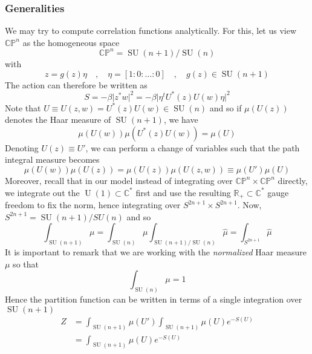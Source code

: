 \documentclass[a4paper,11pt]{article}
\theoremstyle{definition}
\newcommand{\RR}{\mathbb{R}}
\newcommand{\CC}{\mathbb{C}}
\newcommand{\CP}{\mathbb{CP}}
\DeclareMathOperator{\SU}{SU}
\DeclareMathOperator{\U}{U}
\begin{document}
\subsubsection{Generalities}
We may try to compute correlation functions analytically.
For this, let us view $\CP^n$ as the homogeneous space 
\begin{equation}
  \CP^n = \SU(n+1) / \SU(n)
\end{equation}
with 
\begin{equation}
  z = g(z) \eta \quad , \quad \eta = [1:0:\dots:0] \quad , \quad g(z) \in \SU(n+1)
\end{equation}
The action can therefore be written as 
\begin{equation}
  S = -\beta \lvert z^* w \rvert^2 = - \beta \lvert \eta^t U^*(z)U(w) \eta \rvert^2
\end{equation}
Note that $U \equiv U(z,w) = U^*(z)U(w) \in \SU(n)$ and so if $\mu(U(z))$ denotes the Haar measure of $\SU(n+1)$, we have
\begin{equation}
  \mu(U(w)) \mu(U^*(z)U(w)) = \mu(U)
\end{equation}
Denoting $U(z) \equiv U'$, we can perform a change of variables such that the path integral measure becomes
\begin{equation}
  \mu(U(w))\mu(U(z)) = \mu(U(z))\mu(U(z,w)) \equiv \mu(U')\mu(U)
\end{equation}
Moreover, recall that in our model instead of integrating over $\CP^n \times \CP^n$ directly, we integrate out the $\U(1) \subset \CC^*$ first and use the resulting $\RR_+ \subset \CC^*$ gauge freedom to fix the norm, hence integrating over $S^{2n+1} \times S^{2n+1}$. 
Now, $S^{2n+1} = \SU(n+1)/SU(n)$ and so 
\begin{equation}
  \int_{\SU(n+1)} \mu = \int_{\SU(n)} \mu \int_{\SU(n+1)/\SU(n)} \hat{\mu} = \int_{S^{2n+1}}\hat{\mu}
\end{equation}
It is important to remark that we are working with the \emph{normalized} Haar measure $\mu$ so that 
\begin{equation}
  \int_{\SU(n)} \mu = 1
\end{equation}
Hence the partition function can be written in terms of a single integration over $\SU(n+1)$
\begin{equation}
  \begin{split} 
    Z &= \int_{\SU(n+1)} \mu(U') \int_{\SU(n+1)} \mu(U) e^{-S(U)} \\
    &= \int_{\SU(n+1)} \mu(U) e^{-S(U)}
  \end{split}
\end{equation}
\end{document}
